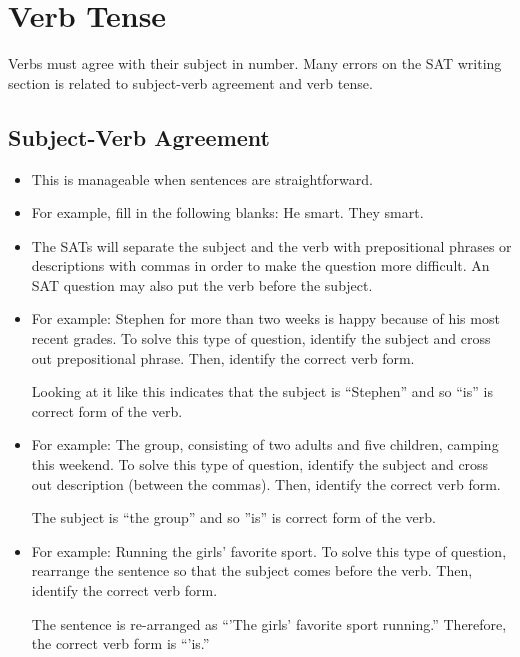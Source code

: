 \section{Verb Tense}

Verbs must agree with their subject in number. Many errors on the SAT writing section is related to subject-verb agreement and verb tense.
\subsection{Subject-Verb Agreement}

\begin{itemize}
\item{This is manageable when sentences are straightforward.}
\item{For example, fill in the following blanks: He smart. They \underline{\hspace{2in}} smart.}
\item{The SATs will separate the subject and the verb with prepositional phrases or descriptions
with commas in order to make the question more difficult. An SAT question may also put
the verb before the subject.}
\item{For example: Stephen for more than two weeks is happy because of his most recent grades. To solve
this type of question, identify the subject and cross out prepositional phrase. Then, identify
the correct verb form.}

\bigskip
Looking at it like this indicates that the subject is ``Stephen'' and so ``is'' is correct form of
the verb.

\item{For example: The group, consisting of two adults and five children, camping this weekend. To solve this type of question, identify the subject and cross out description (between the commas). Then, identify the correct verb form.}

\bigskip
The subject is ``the group'' and so ''is'' is correct form of the verb.

\item{For example: Running the girls' favorite sport. To solve this type of question, rearrange the sentence so that the subject comes before the verb. Then, identify the correct verb form.}

\bigskip
The sentence is re-arranged as ``'The girls' favorite sport \underline{\hspace{2in}} running.'' Therefore, the correct verb form is ``'is.''
\end{itemize}

